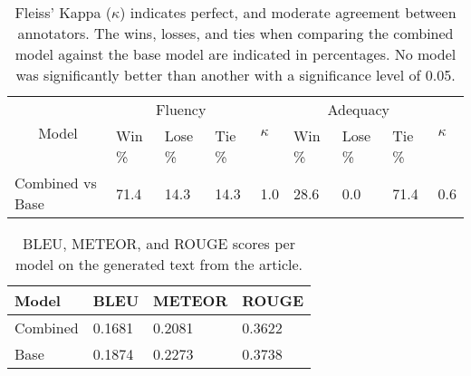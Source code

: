 \documentclass[
]{ceurart}
\begin{document}
\begin{table}[ht]
	\caption{Fleiss' Kappa ($\kappa$) indicates perfect, and moderate agreement between annotators. The wins, losses, and ties when comparing the combined model against the base model are indicated in percentages. No model was significantly better than another with a significance level of 0.05.}

	\centering
	\begin{tabular}{|c|lll|l|lll|l|}
		\hline
		\multirow{2}{*}{Model}                 & \multicolumn{3}{c|}{Fluency} & \multirow{2}{*}{$\kappa$}    & \multicolumn{3}{c|}{Adequacy} & \multirow{2}{*}{$\kappa$}                                                                             \\ \cline{2-4} \cline{6-8}
		                                       & \multicolumn{1}{l|}{Win \%}  & \multicolumn{1}{l|}{Lose \%} & Tie \%                        &                           & \multicolumn{1}{l|}{Win \%} & \multicolumn{1}{l|}{Lose \%} & Tie \% &     \\ \hline
		\multicolumn{1}{|l|}{Combined vs Base} & \multicolumn{1}{l|}{71.4}    & \multicolumn{1}{l|}{14.3}    & 14.3                          & 1.0                       & \multicolumn{1}{l|}{28.6}   & \multicolumn{1}{l|}{0.0}     & 71.4   & 0.6 \\ \hline
	\end{tabular}
	\label{tab:event_annotations}
\end{table}

\begin{table}[hb]
	\caption{BLEU, METEOR, and ROUGE scores per model on the generated text from the article.}
	\centering
	\begin{tabular}{|l|l|l|l|}
		\hline
		\textbf{Model} & \textbf{BLEU} & \textbf{METEOR} & \textbf{ROUGE} \\ \hline
		Combined       & 0.1681        & 0.2081          & 0.3622         \\ \hline
		Base           & 0.1874        & 0.2273          & 0.3738         \\ \hline
	\end{tabular}

	\label{tab:article_auto_metrics}
\end{table}
\end{document}
